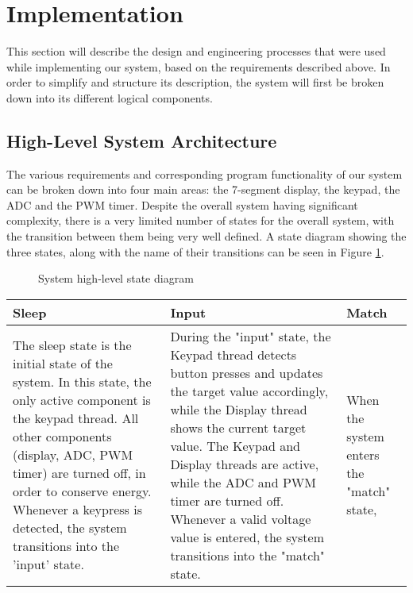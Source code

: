 \section{Implementation}

This section will describe the design and engineering processes that were used while implementing our system, based on the requirements described above. In order to simplify and structure its description, the system will first be broken down into its different logical components.


\subsection{High-Level System Architecture}
The various requirements and corresponding program functionality of our system can be broken down into four main areas: the 7-segment display, the keypad, the ADC and the PWM timer. Despite the overall system having significant complexity, there is a very limited number of states for the overall system, with the transition between them being very well defined. A state diagram showing the three states, along with the name of their transitions can be seen in Figure \ref{fig:high_level_state_diagram}.


\begin{figure}[h]
\centering
{}
\caption{System high-level state diagram}
\label{fig:high_level_state_diagram}
\end{figure}




\begin{tabular}{ p{5cm} | p{5cm} | p{5cm}}
Sleep & Input & Match \\
\hline
The sleep state is the initial state of the system. In this state, the only active component is the keypad thread. All other components (display, ADC, PWM timer) are turned off, in order to conserve energy. Whenever a keypress is detected, the system transitions into the 'input' state.
&
During the "input" state, the Keypad thread detects button presses and updates the target value accordingly, while the Display thread shows the current target value. The Keypad and Display threads are active, while the ADC and PWM timer are turned off. Whenever a valid voltage value is entered, the system transitions into the "match" state.
&
When the system enters the "match" state, 
\\
\end{tabular}


